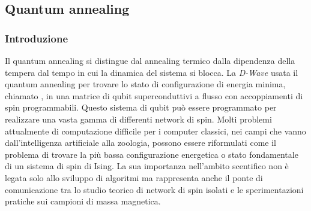\subsection{Quantum annealing}
\subsubsection{Introduzione}
Il quantum annealing si distingue dal annealing termico dalla dipendenza della tempera dal tempo in cui la dinamica del sistema si blocca. La \textit{D-Wave} usata il quantum annealing per trovare lo stato di configurazione di energia minima, chiamato , in una matrice di qubit superconduttivi a flusso con accoppiamenti di spin programmabili. Questo sistema di qubit può essere programmato per realizzare una vasta gamma di differenti network di spin. Molti problemi attualmente di computazione difficile per i computer classici, nei campi che vanno dall'intelligenza artificiale alla zoologia, possono essere riformulati come il problema di trovare la più bassa configurazione energetica o stato fondamentale di un sistema di spin di Ising. La sua importanza nell'ambito scentifico non è legata solo allo sviluppo di algoritmi ma rappresenta anche il ponte di comunicazione tra lo studio teorico di network di spin isolati e le sperimentazioni pratiche sui campioni di massa magnetica.
